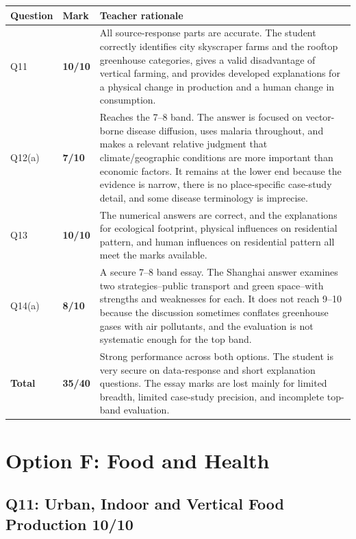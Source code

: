 \documentclass[11pt,a4paper]{article}
\newcommand{\score}[1]{\textcolor{AccentTeal}{\textbf{#1}}}
\begin{document}
\begin{tabularx}{\textwidth}{L{0.16\textwidth}L{0.14\textwidth}Y}
\toprule
\textbf{Question} & \textbf{Mark} & \textbf{Teacher rationale} \\
\midrule
Q11 & \score{10/10} & All source-response parts are accurate. The student
correctly identifies city skyscraper farms and the rooftop greenhouse
categories, gives a valid disadvantage of vertical farming, and provides
developed explanations for a physical change in production and a human change
in consumption. \\
Q12(a) & \score{7/10} & Reaches the 7--8 band. The answer is focused on
vector-borne disease diffusion, uses malaria throughout, and makes a relevant
relative judgment that climate/geographic conditions are more important than
economic factors. It remains at the lower end because the evidence is narrow,
there is no place-specific case-study detail, and some disease terminology is
imprecise. \\
Q13 & \score{10/10} & The numerical answers are correct, and the explanations
for ecological footprint, physical influences on residential pattern, and human
influences on residential pattern all meet the marks available. \\
Q14(a) & \score{8/10} & A secure 7--8 band essay. The Shanghai answer examines
two strategies--public transport and green space--with strengths and
weaknesses for each. It does not reach 9--10 because the discussion sometimes
conflates greenhouse gases with air pollutants, and the evaluation is not
systematic enough for the top band. \\
\midrule
\textbf{Total} & \score{35/40} & Strong performance across both options. The
student is very secure on data-response and short explanation questions. The
essay marks are lost mainly for limited breadth, limited case-study precision,
and incomplete top-band evaluation. \\
\bottomrule
\end{tabularx}

\section{Option F: Food and Health}

\subsection{Q11: Urban, Indoor and Vertical Food Production \score{10/10}}
\end{document}
